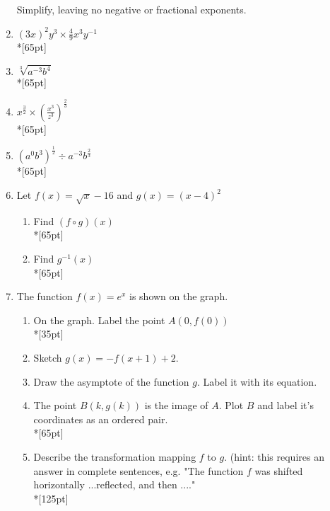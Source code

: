 \documentclass[]{book}
\begin{document}
\begin{enumerate}
\begin{figure}[!htbp]
\begin{center}
\begin{tikzpicture}
\end{tikzpicture}
\end{center}
\end{figure}

\newpage
Simplify, leaving no negative or fractional exponents.

\item $(3x)^{2}y^3 \times \frac{4}{9}x^3 y^{-1}$\\*[65pt]
\item $\sqrt[3]{a^{-3} b^{4}}$\\*[65pt]
\item $\displaystyle x^{\frac{3}{2}} \times (\frac{x^3}{z^3})^{\frac{2}{3}}$\\*[65pt]
\item $\displaystyle (a^0 b^3)^{\frac{1}{2}} \div a^{-3} b^\frac{2}{3}$\\*[65pt]

\item Let $f(x) = \sqrt{x} -16$ and $g(x)=(x-4)^2$
\begin{enumerate}
    \item Find $(f \circ g)(x)$\\*[65pt]
    \item Find $g^{-1}(x)$\\*[65pt]
\end{enumerate}

\newpage
\item The function $f(x)=e^x$ is shown on the graph. 
\begin{enumerate}
    \item On the graph. Label the point $A(0, f(0))$\\*[35pt]
    \item Sketch $g(x)=-f(x+1)+2$. 
    \item Draw the asymptote of the function $g$. Label it with its equation.
    \item The point $B(k, g(k))$ is the image of $A$. Plot $B$ and label it's coordinates as an ordered pair.\\*[65pt]
    \item Describe the transformation mapping $f$ to $g$. (hint: this requires an answer in complete sentences, e.g. "The function $f$ was shifted horizontally ...reflected, and then ...."\\*[125pt]
\end{enumerate}



\begin{figure}[!htbp]
\begin{center}
\begin{tikzpicture}


\end{tikzpicture}
\end{center}
\end{figure}
\end{enumerate}
\end{document}
